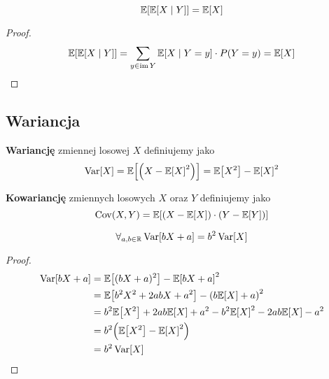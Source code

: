 \begin{lemma}
	\[
		\expected{\expected{X \mid Y}} = \expected{X}
	\]
\end{lemma}
\begin{proof}
	\begin{equation*}
		\expected{\expected{X \mid Y}}
		= \sum_{y \in \im Y} \expected{X \mid Y = y} \cdot P(Y = y) = \expected{X}
	\end{equation*}
\end{proof}

\subsection{Wariancja}
\begin{definition}
	\textbf{Wariancję} zmiennej losowej \( X \) definiujemy jako
	\[
		\variance{X} = \expected{\pars{X - \expected{X}^2}} = \expected{X^2} - \expected{X}^2
	\]
\end{definition}
\begin{definition}
	\textbf{Kowariancję} zmiennych losowych \( X \) oraz \( Y \) definiujemy jako
	\[
		\covariance{X}{Y} = \expected{\pars{X - \expected{X}} \cdot \pars{Y - \expected{Y}}}
	\]
\end{definition}

\begin{theorem}
	\[
		\forall_{a, b \in \real} \variance{bX + a} = b^2\variance{X}
	\]
\end{theorem}
\begin{proof}
	\begin{align*}
		\variance{bX + a}
		 & = \expected{(bX + a)^2} - \expected{bX + a}^2                                           \\
		 & = \expected{b^2X^2 + 2abX + a^2} - \pars{b\expected{X} + a}^2                           \\
		 & = b^2\expected{X^2} + 2ab\expected{X} + a^2 - b^2\expected{X}^2 - 2ab\expected{X} - a^2 \\
		 & = b^2\pars{\expected{X^2} - \expected{X}^2}                                             \\
		 & = b^2\variance{X}
	\end{align*}
\end{proof}

